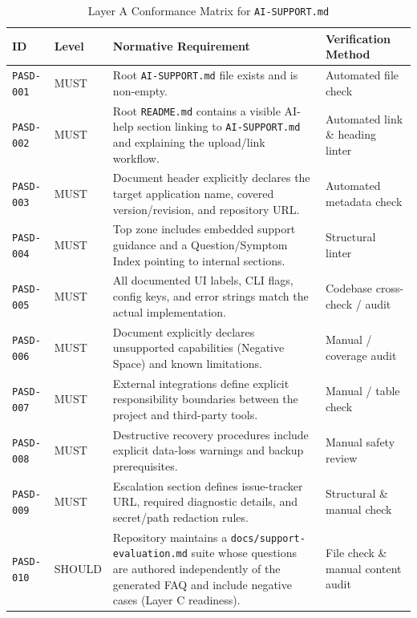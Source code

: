 \documentclass[12pt, a4paper]{article}
\begin{document}
\begin{table}[htbp]
\centering
\caption{Layer A Conformance Matrix for \texttt{AI-SUPPORT.md}}
\label{tab:conformance}
\footnotesize
\renewcommand{\arraystretch}{1.25}
\begin{tabularx}{\textwidth}{@{}l l >{\raggedright\arraybackslash}X p{}@{}}
\toprule
\textbf{ID} & \textbf{Level} & \textbf{Normative Requirement} & \textbf{Verification Method} \\
\midrule
\texttt{PASD-001} & MUST & Root \texttt{AI-SUPPORT.md} file exists and is non-empty. & Automated file check \\
\texttt{PASD-002} & MUST & Root \texttt{README.md} contains a visible AI-help section linking to \texttt{AI-SUPPORT.md} and explaining the upload/link workflow. & Automated link \& heading linter \\
\texttt{PASD-003} & MUST & Document header explicitly declares the target application name, covered version/revision, and repository URL. & Automated metadata check \\
\texttt{PASD-004} & MUST & Top zone includes embedded support guidance and a Question/Symptom Index pointing to internal sections. & Structural linter \\
\texttt{PASD-005} & MUST & All documented UI labels, CLI flags, config keys, and error strings match the actual implementation. & Codebase cross-check / audit \\
\texttt{PASD-006} & MUST & Document explicitly declares unsupported capabilities (Negative Space) and known limitations. & Manual / coverage audit \\
\texttt{PASD-007} & MUST & External integrations define explicit responsibility boundaries between the project and third-party tools. & Manual / table check \\
\texttt{PASD-008} & MUST & Destructive recovery procedures include explicit data-loss warnings and backup prerequisites. & Manual safety review \\
\texttt{PASD-009} & MUST & Escalation section defines issue-tracker URL, required diagnostic details, and secret/path redaction rules. & Structural \& manual check \\
\texttt{PASD-010} & SHOULD & Repository maintains a \texttt{docs/support-evaluation.md} suite whose questions are authored independently of the generated FAQ and include negative cases (Layer C readiness). & File check \& manual content audit \\
\bottomrule
\end{tabularx}
\end{table}
\end{document}
